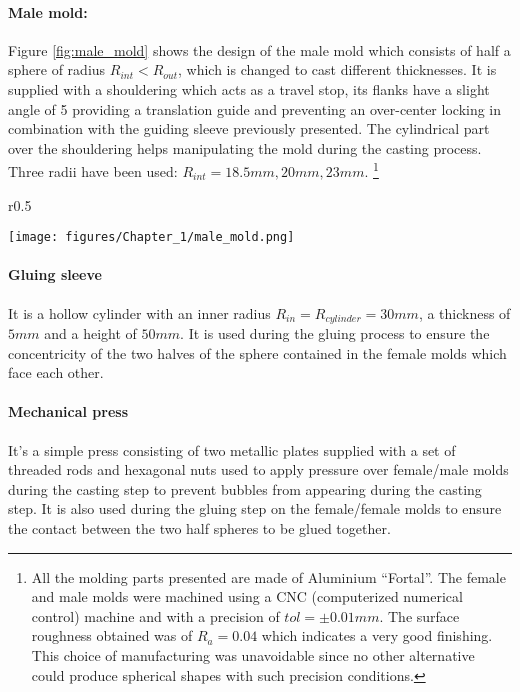 \paragraph{Male mold:}
Figure \ref{fig:male_mold} shows the design of the male mold which consists of half a sphere of radius $R_{int}<R_{out}$, which is changed to cast different thicknesses. It is supplied with a shouldering which acts as a travel stop, its flanks have a slight angle of 5 providing a translation guide and preventing an over-center locking in combination with the guiding sleeve previously presented. The cylindrical part over the shouldering helps manipulating the mold during the casting process. Three radii have been used: $R_{int} = 18.5 mm, 20 mm, 23 mm$. 
\footnote{All the molding parts presented are made of Aluminium "`Fortal"'. The female and male molds were machined using a CNC (computerized numerical control)  machine and with a precision of $tol =\pm 0.01 mm$. The surface roughness obtained was of $R_a = 0.04$ which indicates a very good finishing.
This choice of manufacturing was unavoidable since no other alternative could produce spherical shapes with such precision conditions.}
\begin{wrapfigure}{r}{0.5\textwidth}
  \begin{center}
    \texttt{[image: figures/Chapter\_1/male\_mold.png]}
  \end{center}
	\label{fig:male_mold}
  \caption{longitudinal section of the male mold}
\end{wrapfigure}%
\paragraph{Gluing sleeve}
It is a hollow cylinder with an inner radius $R_{in} = R_{cylinder} = 30 mm$, a thickness of $5 mm$ and a height of $50 mm$. It is used during the gluing process to ensure the concentricity of the two halves of the sphere contained in the female molds which face each other.
\paragraph{Mechanical press}
It's a simple press consisting of two metallic plates supplied with a set of threaded rods and hexagonal nuts used to apply pressure over female/male molds during the casting step to prevent bubbles from appearing during the casting step. It is also used during the gluing step on the female/female molds to ensure the contact between the two half spheres to be glued together.
